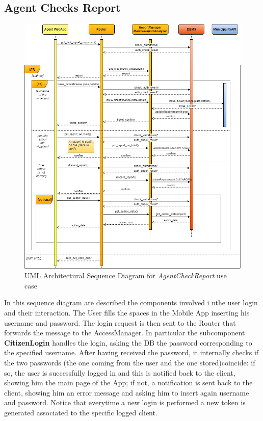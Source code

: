 \documentclass[a4paper]{report}
\begin{document}
\subsection{Agent Checks Report}
\begin{figure}[hp]
\includegraphics[width=\textwidth]{ArchSequenceAgentCheckReport}
\caption{UML Architectural Sequence Diagram for \textit{AgentCheckReport} use case}
\label{fig:seq-checkReport}
\end{figure}
\restoregeometry

In this sequence diagram are described the components involved i nthe user login and their interaction. The User fills the spaces in the Mobile App inserting his username and password. The login request is then sent to the Router that forwards the message to the AccessManager. In particular the subcomponent \textbf{CitizenLogin}  handles the login, asking the DB the password corresponding to the specified username. After having received the password, it internally checks if  the two passwords (the one coming from the user and the one stored)coincide: if so, the user is successfully logged in and this is notified back to the client, showing him the main page of the App; if not, a notification is sent back to the client, showing him an error message and asking him to insert again username and password. Notice that everytime a new login is performed a new token is generated associated to the specific logged client.
\end{document}
